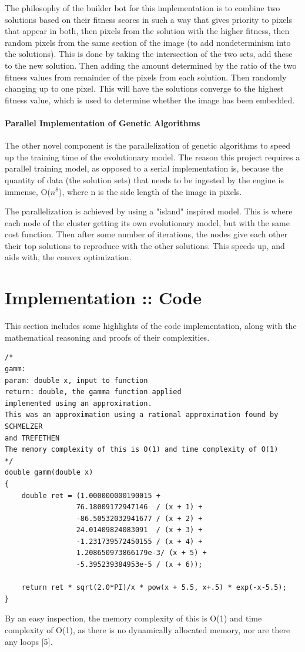 \documentclass[12pt]{article}
\begin{document}
\par The philosophy of the builder bot for this implementation is to combine two solutions based on their fitness scores in such a way that gives priority to pixels that appear in both, then pixels from the solution with the higher fitness, then random pixels from the same section of the image (to add nondeterminism into the solutions). This is done by taking the intersection of the two sets, add these to the new solution. Then adding the amount determined by the ratio of the two fitness values from remainder of the pixels from each solution. Then randomly changing up to one pixel. This will have the solutions converge to the highest fitness value, which is used to determine whether the image has been embedded. 

\paragraph{Parallel Implementation of Genetic Algorithms}
\par The other novel component is the parallelization of genetic
algorithms to speed up the training time of the evolutionary model. The reason this project requires a parallel training model, as opposed to a serial implementation is, because the quantity of data (the solution sets) that needs to be ingested by the engine is immense, O($n^8$), where n is the side length of the image in pixels.
\par The parallelization is achieved by using a "island" inspired model. This is where each node of the cluster getting its own evolutionary model, but with the same cost function. Then after some number of iterations, the nodes give each other their top solutions to reproduce with the other solutions. This speeds up, and aids with, the convex optimization.
\


\section{Implementation :: Code}
This section includes some highlights of the code implementation, along with the mathematical reasoning and proofs of their complexities.
\lstset { 
    language=C++,
    basicstyle=\footnotesize,
}
\begin{lstlisting}
/*
gamm:
param: double x, input to function
return: double, the gamma function applied
implemented using an approximation.
This was an approximation using a rational approximation found by SCHMELZER
and TREFETHEN
The memory complexity of this is O(1) and time complexity of O(1)
*/
double gamm(double x) 
{
    double ret = (1.000000000190015 + 
                 76.18009172947146  / (x + 1) +  
                 -86.50532032941677 / (x + 2) + 
                 24.01409824083091  / (x + 3) +  
                 -1.231739572450155 / (x + 4) + 
                 1.208650973866179e-3/ (x + 5) + 
                 -5.395239384953e-5 / (x + 6));
    
    return ret * sqrt(2.0*PI)/x * pow(x + 5.5, x+.5) * exp(-x-5.5);
}
\end{lstlisting}
By an easy inspection, the memory complexity of this is O(1) and time complexity of O(1), as there is no dynamically allocated memory, nor are there any loops [5].
\end{document}
